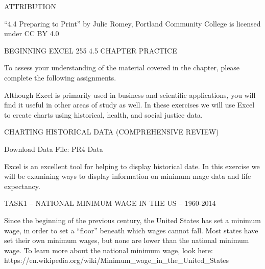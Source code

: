 ATTRIBUTION

“4.4 Preparing to Print” by Julie Romey, Portland Community College is licensed under CC BY 4.0




BEGINNING EXCEL 255
4.5 CHAPTER PRACTICE




To assess your understanding of the material covered in the chapter, please complete the following
assignments.

Although Excel is primarily used in business and scientific applications, you will find it useful in other
areas of study as well. In these exercises we will use Excel to create charts using historical, health, and
social justice data.

CHARTING HISTORICAL DATA (COMPREHENSIVE REVIEW)

Download Data File: PR4 Data

Excel is an excellent tool for helping to display historical date. In this exercise we will be examining
ways to display information on minimum mage data and life expectancy.



TASK1 – NATIONAL MINIMUM WAGE IN THE US – 1960-2014

Since the beginning of the previous century, the United States has set a minimum wage, in order to set
a “floor” beneath which wages cannot fall. Most states have set their own minimum wages, but none
are lower than the national minimum wage. To learn more about the national minimum wage, look
here: https://en.wikipedia.org/wiki/Minimum_wage_in_the_United_States

